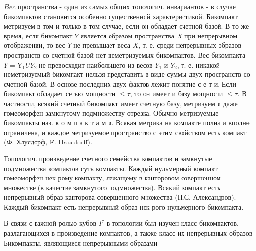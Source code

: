 \documentclass[10pt]{article}
\begin{document}
$B e c$ пространства - один из самых общих топологич. инвариантов - в случае бикомпактов становится особенно существенной характеристикой. Бикомпакт метризуем в том и только в том случае, если он обладает счетной базой. В то же время, если бикомпакт $Y$ является образом пространства $X$ при непрерывном отображении, то вес $Y$ не превышает веса $X$, т. е. среди непрерывных образов пространств со счетной базой нет неметризуемых бикомпактов. Вес бикомпакта $Y=\mathrm{Y}_{1} U Y_{2}$ не превосходит наибольшего из весов $Y_{1}$ и $Y_{2}$, т. е. никакой неметризуемый бикомпакт нельзя представить в виде суммы двух пространств со счетной базой. В основе последних двух фактов лежит понятие с е т и. Если бикомпакт обладает сетью мощности $\leqslant \tau$, то он имеет и базу мощности $\leqslant \tau$. В частности, всякий счетный бикомпакт имеет счетную базу, метризуем и даже гомеоморфен замкнутому подмножеству отрезка. Обычно метризуемые бикомпакты наз. к о м п а к т а м и. Всякая метрика на компакте полна и вполнө ограничена, и каждое метризуемое пространство с этим свойством есть компакт (Ф. Хаусдорф, F. Hausdorff).



Топологич. произведение счетного семейства компактов и замкнутые подмножества компактов суть компакты. Каждый нульмерный компакт гомеоморфен нек-рому компакту, лежащему в канторовом совершенном множестве (в качестве замкнутого подмножества). Всякий компакт есть непрерывный образ канторова совершенного множества (П.С. Александров). Каждый бикомпакт есть непрерывный образ нек-рого нульмерного бикомпакта.



В связи с важной ролью кубов $I^{\tau}$ в топологии был изучен класс бикомпактов, разлагающихся в произведение компактов, а также класс их непрерывных образов Бикомпакты, являющиеся непрерывными образами
\end{document}
